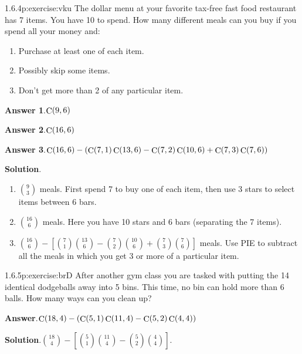 \documentclass[twoside,11pt,]{book}
\newcommand{\blocktitlefont}{\relax}
\numberwithin{equation}{chapter}
\begin{document}
\begin{divisionsolution}{1.6.4}{}{p:exercise:vku}%
The dollar menu at your favorite tax-free fast food restaurant has 7 items. You have \textdollar{}10 to spend. How many different meals can you buy if you spend all your money and:%
\begin{enumerate}[label=(\alph*)]
\item{}Purchase at least one of each item.%
\item{}Possibly skip some items.%
\item{}Don't get more than 2 of any particular item.%
\end{enumerate}
%
\par\smallskip%
\noindent\textbf{\blocktitlefont Answer 1}.\quad{}\(\mathop{\rm C}\nolimits\!\left(9,6\right)\)%
\par\smallskip%
\noindent\textbf{\blocktitlefont Answer 2}.\quad{}\(\mathop{\rm C}\nolimits\!\left(16,6\right)\)%
\par\smallskip%
\noindent\textbf{\blocktitlefont Answer 3}.\quad{}\(\mathop{\rm C}\nolimits\!\left(16,6\right)-\left(\mathop{\rm C}\nolimits\!\left(7,1\right)\mathop{\rm C}\nolimits\!\left(13,6\right)-\mathop{\rm C}\nolimits\!\left(7,2\right)\mathop{\rm C}\nolimits\!\left(10,6\right)+\mathop{\rm C}\nolimits\!\left(7,3\right)\mathop{\rm C}\nolimits\!\left(7,6\right)\right)\)%
\par\smallskip%
\noindent\textbf{\blocktitlefont Solution}.\quad{}%
\begin{enumerate}[label=(\alph*)]
\item{}\({9 \choose 3}\) meals. First spend \textdollar{}7 to buy one of each item, then use 3 stars to select items between 6 bars.%
\item{}\({16 \choose 6}\) meals. Here you have 10 stars and 6 bars (separating the 7 items).%
\item{}\({16 \choose 6} - \left[{7 \choose 1}{13 \choose 6} - {7 \choose 2}{10 \choose 6} + {7 \choose 3}{7 \choose 6}\right]\) meals. Use PIE to subtract all the meals in which you get 3 or more of a particular item.%
\end{enumerate}
%
\end{divisionsolution}%
\begin{divisionsolution}{1.6.5}{}{p:exercise:brD}%
After another gym class you are tasked with putting the 14 identical dodgeballs away into 5 bins. This time, no bin can hold more than 6 balls. How many ways can you clean up?%
\par\smallskip%
\noindent\textbf{\blocktitlefont Answer}.\quad{}\(\mathop{\rm C}\nolimits\!\left(18,4\right)-\left(\mathop{\rm C}\nolimits\!\left(5,1\right)\mathop{\rm C}\nolimits\!\left(11,4\right)-\mathop{\rm C}\nolimits\!\left(5,2\right)\mathop{\rm C}\nolimits\!\left(4,4\right)\right)\)%
\par\smallskip%
\noindent\textbf{\blocktitlefont Solution}.\quad{}\({18 \choose 4} - \left[ {5 \choose 1}{11 \choose 4} - {5 \choose 2}{4 \choose 4}\right]\text{.}\)%
\end{divisionsolution}%
\end{document}
